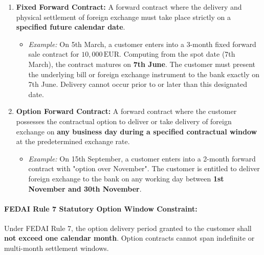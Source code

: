 \begin{enumerate}[leftmargin=*]
    \item \textbf{Fixed Forward Contract:}
    A forward contract where the delivery and physical settlement of foreign exchange must take place strictly on a \textbf{specified future calendar date}.
    \begin{itemize}[noitemsep]
        \item \textit{Example:} On 5th March, a customer enters into a 3-month fixed forward sale contract for $10,000\,\text{EUR}$. Computing from the spot date (7th March), the contract matures on \textbf{7th June}. The customer must present the underlying bill or foreign exchange instrument to the bank exactly on 7th June. Delivery cannot occur prior to or later than this designated date.
    \end{itemize}

    \item \textbf{Option Forward Contract:}
    A forward contract where the customer possesses the contractual option to deliver or take delivery of foreign exchange on \textbf{any business day during a specified contractual window} at the predetermined exchange rate.
    \begin{itemize}[noitemsep]
        \item \textit{Example:} On 15th September, a customer enters into a 2-month forward contract with "option over November". The customer is entitled to deliver foreign exchange to the bank on any working day between \textbf{1st November and 30th November}.
    \end{itemize}
\end{enumerate}

\paragraph{FEDAI Rule 7 Statutory Option Window Constraint:}
Under FEDAI Rule 7, the option delivery period granted to the customer shall \textbf{not exceed one calendar month}. Option contracts cannot span indefinite or multi-month settlement windows.

